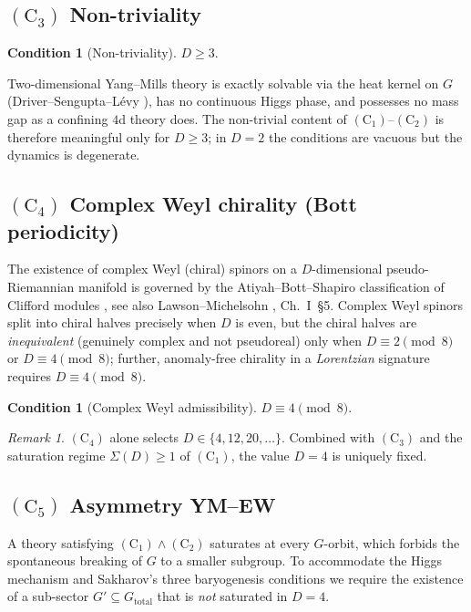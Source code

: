 \documentclass[11pt,reqno]{amsart}
\theoremstyle{plain}
\theoremstyle{definition}
\newtheorem{condition}[theorem]{Condition}
\theoremstyle{remark}
\newtheorem{remark}[theorem]{Remark}
\newcommand{\Cone}{(\mathrm{C}_1)}
\newcommand{\Ctwo}{(\mathrm{C}_2)}
\newcommand{\Cthree}{(\mathrm{C}_3)}
\newcommand{\Cfour}{(\mathrm{C}_4)}
\newcommand{\Cfive}{(\mathrm{C}_5)}
\begin{document}
\subsection{$\Cthree$ Non-triviality}\label{ssec:C3}

\begin{condition}[Non-triviality]\label{cond:C3}
$D \ge 3$.
\end{condition}

Two-dimensional Yang--Mills theory is exactly solvable via the heat kernel on $G$ (Driver--Sengupta--L\'evy \cite{Driver1989, Sengupta1992, Levy2003}), has no continuous Higgs phase, and possesses no mass gap as a confining $4$d theory does. The non-trivial content of $\Cone$--$\Ctwo$ is therefore meaningful only for $D \ge 3$; in $D = 2$ the conditions are vacuous but the dynamics is degenerate.

\subsection{$\Cfour$ Complex Weyl chirality (Bott periodicity)}\label{ssec:C4}

The existence of complex Weyl (chiral) spinors on a $D$-dimensional pseudo-Riemannian manifold is governed by the Atiyah--Bott--Shapiro classification of Clifford modules \cite{ABS64}, see also Lawson--Michelsohn \cite{LawsonMichelsohn}, Ch.~I~\S5. Complex Weyl spinors split into chiral halves precisely when $D$ is even, but the chiral halves are \emph{inequivalent} (genuinely complex and not pseudoreal) only when $D \equiv 2 \pmod 8$ or $D \equiv 4 \pmod 8$; further, anomaly-free chirality in a \emph{Lorentzian} signature requires $D \equiv 4 \pmod 8$.

\begin{condition}[Complex Weyl admissibility]\label{cond:C4}
$D \equiv 4 \pmod 8$.
\end{condition}

\begin{remark}
$\Cfour$ alone selects $D \in \{4, 12, 20, \dots\}$. Combined with $\Cthree$ and the saturation regime $\Sigma(D) \ge 1$ of $\Cone$, the value $D = 4$ is uniquely fixed.
\end{remark}

\subsection{$\Cfive$ Asymmetry YM--EW}\label{ssec:C5}

A theory satisfying $\Cone \wedge \Ctwo$ saturates at every $G$-orbit, which forbids the spontaneous breaking of $G$ to a smaller subgroup. To accommodate the Higgs mechanism and Sakharov's three baryogenesis conditions \cite{Sakharov1967} we require the existence of a sub-sector $G' \subseteq G_{\mathrm{total}}$ that is \emph{not} saturated in $D = 4$.
\end{document}
